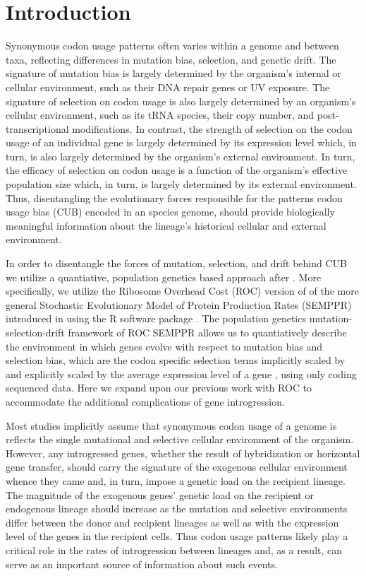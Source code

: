 \documentclass[12pt]{article}
\begin{document}
\section*{Introduction}
Synonymous codon usage patterns often varies within a genome and between taxa, reflecting differences in mutation bias, selection, and genetic drift.
The signature of mutation bias is largely determined by the organism's internal or cellular environment, such as their DNA repair genes or UV exposure.
The signature of selection on codon usage is also largely determined by an organism's cellular environment, such as its tRNA species, their copy number, and post-transcriptional modifications.
In contrast, the strength of selection on the codon usage of an individual gene is largely determined by its expression level which, in turn, is also largely determined by the organism's external environment.
In turn, the efficacy of selection on codon usage is a function of the organism's effective population size \Ne which, in turn, is largely determined by its external environment.
Thus, disentangling the evolutionary forces responsible for the patterns codon usage bias (CUB) encoded in an species genome, should provide biologically meaningful information about the lineage's historical cellular and external environment.

In order to disentangle the forces of mutation, selection, and drift behind CUB we utilize a quantiative, population genetics based approach after \citet{Bulmer1991}.
More specifically, we utilize the Ribosome Overhead Cost (ROC) version of \citet{ShahAndGilchrist2011} of the more general Stochastic Evolutionary Model of Protein Production Rates (SEMPPR) introduced in \citet{Gilchrist2007} using the R software package \citet{landerer2018}.   
The population genetics mutation-selection-drift framework of ROC SEMPPR allows us to quantiatively describe the environment in which genes evolve with respect to mutation bias and selection bias, which are the codon specific selection terms implicitly scaled by \Ne and explicitly scaled by the average expression level of a gene \citep[See][for more details]{GilchristEtAl2015}, using only coding sequenced data.
Here we expand upon our previous work with ROC to accommodate the additional complications of gene introgression.

Most studies implicitly assume that synonymous codon usage of a genome is reflects the single mutational and selective cellular environment of the organism. 
However, any introgressed genes, whether the result of hybridization or horizontal gene transfer, should carry the signature of the exogenous cellular environment whence they came and, in turn, impose a genetic load on the recipient lineage.
The magnitude of the exogenous genes' genetic load on the recipient or endogenous lineage should increase as the mutation and selective environments differ between the donor and recipient lineages as well as with the expression level of the genes in the recipient cells.
Thus codon usage patterns likely play a critical role in the rates of introgression between lineages and, as a result, can serve as an important source of information about such events.
\end{document}
